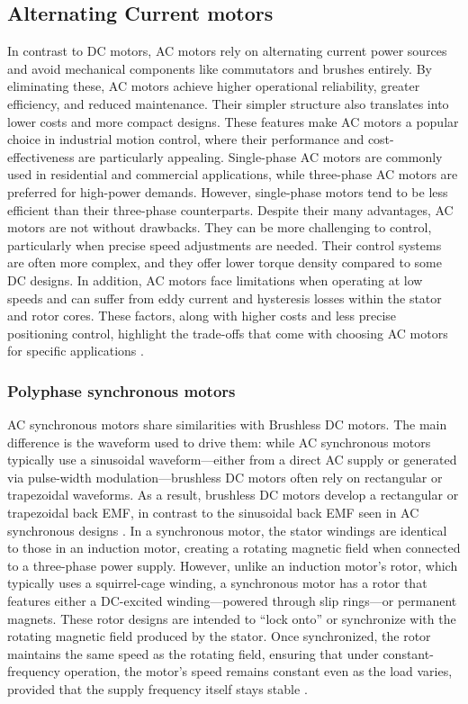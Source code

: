 \subsection{Alternating Current motors}
In contrast to DC motors, AC motors rely on alternating current power sources and avoid mechanical components like commutators and brushes entirely. By eliminating these, AC motors achieve higher operational reliability, greater efficiency, and reduced maintenance. Their simpler structure also translates into lower costs and more compact designs. These features make AC motors a popular choice in industrial motion control, where their performance and cost-effectiveness are particularly appealing. Single-phase AC motors are commonly used in residential and commercial applications, while three-phase AC motors are preferred for high-power demands. However, single-phase motors tend to be less efficient than their three-phase counterparts.
Despite their many advantages, AC motors are not without drawbacks. They can be more challenging to control, particularly when precise speed adjustments are needed. Their control systems are often more complex, and they offer lower torque density compared to some DC designs. In addition, AC motors face limitations when operating at low speeds and can suffer from eddy current and hysteresis losses within the stator and rotor cores. These factors, along with higher costs and less precise positioning control, highlight the trade-offs that come with choosing AC motors for specific applications \cite[see][39]{Tong:2014}.

\subsubsection{Polyphase synchronous motors}
AC synchronous motors share similarities with Brushless DC motors. The main difference is the waveform used to drive them: while AC synchronous motors typically use a sinusoidal waveform—either from a direct AC supply or generated via pulse-width modulation—brushless DC motors often rely on rectangular or trapezoidal waveforms. As a result, brushless DC motors develop a rectangular or trapezoidal back EMF, in contrast to the sinusoidal back EMF seen in AC synchronous designs \cite[see][39]{Tong:2014}.
In a synchronous motor, the stator windings are identical to those in an induction motor, creating a rotating magnetic field when connected to a three-phase power supply. However, unlike an induction motor’s rotor, which typically uses a squirrel-cage winding, a synchronous motor has a rotor that features either a DC-excited winding—powered through slip rings—or permanent magnets. These rotor designs are intended to “lock onto” or synchronize with the rotating magnetic field produced by the stator. Once synchronized, the rotor maintains the same speed as the rotating field, ensuring that under constant-frequency operation, the motor’s speed remains constant even as the load varies, provided that the supply frequency itself stays stable \cite[see][39]{Hughes:2006}.

